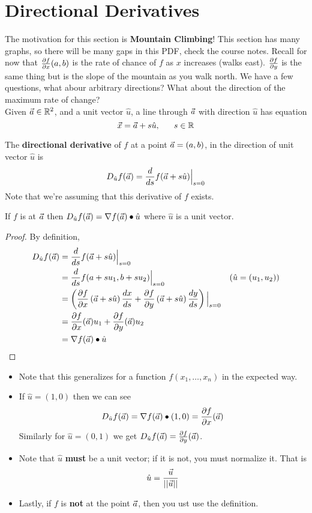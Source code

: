 \documentclass[english, 11pt]{article}
\begin{document}
\section{Directional Derivatives}

The motivation for this section is \textbf{Mountain Climbing}! This section has many graphs, so there will be many gaps in this PDF, check the course notes. Recall for now that $\frac{\partial f}{\partial x}(a,b)$ is the rate of chance of $f$ as $x$ increases (walks east). $\frac{\partial f}{\partial y}$ is the same thing but is the slope of the mountain as you walk north. We have a few questions, what abour arbitrary directions? What about the direction of the maximum rate of change? \\

Given $\vec{a} \in {\mathbb{R}}^2$, and a unit vector $\hat{u}$, a line through $\vec{a}$ with direction $\hat{u}$ has equation
\[ \vx = \va + s\hat{u}, \ \ \ \ \ s \in \R \]
\begin{defn}\label{directional derivative}
The \textbf{directional derivative} of $f$ at a point $\vec{a} = (a,b)$, in the direction of unit vector $\hat{u}$ is
\[ D_{\hat{u}}f(\vec{a}) = \frac{d}{ds} f(\vec{a} + s \hat{u}) \Big|_{s= 0}\]
Note that we're assuming that this derivative of $f$ exists.
\end{defn}

\begin{thrm}\label{directiondiffthrm}
  If $f$ is  at $\vec{a}$ then $D_{\hat{u}}f(\vec{a}) = \nabla f(\vec{a}) \bullet \hat{u}$ where $\hat{u}$ is a unit vector.
\end{thrm}

\begin{proof}
  By definition,
  \begin{align*}
    D_{\hat{u}}f(\vec{a}) & = \frac{d}{ds} f(\vec{a} + s \hat{u}) \Big|_{s= 0} \\
    & = \frac{d}{ds}f(a+su_1, b+su_2)\Big|_{s=0} & (\hat{u} = (u_1, u_2)) \\
    & = \left(\frac{\partial f}{\partial x} \left( \vec{a} + s\hat{u} \right)\frac{dx}{ds} + \frac{\partial f}{\partial y} \left( \vec{a} + s \hat{u} \right) \frac{dy}{ds}\right) \Big|_{s=0} \\
    & = \frac{\partial f}{\partial x} (\vec{a}) u_1 + \frac{\partial f}{\partial y} (\vec{a}) u_2 \\
    & = \nabla f(\vec{a}) \bullet \hat{u}
  \end{align*}
\end{proof}


\begin{itemize}
  \item Note that this generalizes for a function $f(x_1,\ldots,x_n)$ in the expected way.
  \item If $\hat{u} = (1,0)$ then we can see
  \[ D_{\hat u}f(\vec{a}) = \nabla f(\vec{a}) \bullet (1,0) = \frac{\partial f}{\partial x}(\vec{a}) \]
Similarly for $\hat{u} = (0,1)$ we get $D_{\hat{u}}f(\vec{a}) = \frac{\partial f}{\partial y}(\vec{a})$.
\item Note that $\hat{u}$ \textbf{must} be a unit vector; if it is not, you must normalize it. That is
\[ \hat{u} = \frac{\vec{u}}{||\vec{u}||} \]
\item Lastly, if $f$ is \textbf{not}  at the point $\vec{a}$, then you ust use the definition.
\end{itemize}
\end{document}
